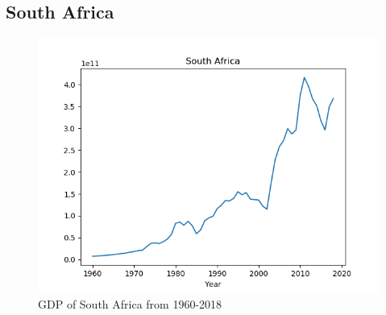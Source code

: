 \documentclass[11pt,a4paper]{CLabBookTemplate} %
\begin{document}
\subsection{South Africa}
\begin{figure}[h!]
	\centering
	\includegraphics[width = 120mm]{Figures/RSAGDP.png}
	\caption{GDP of South Africa from 1960-2018}
	\label{fig:RSAGDP}
\end{figure}
\end{document}
